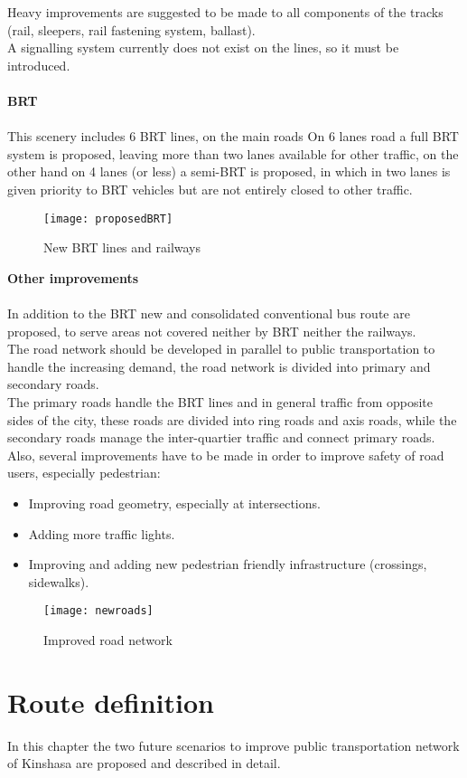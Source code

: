 \documentclass{article}
\begin{document}
Heavy improvements are suggested to be made to all components of the tracks (rail, sleepers, rail fastening system, ballast). \\ 
A signalling system currently does not exist on the lines, so it must be introduced. \\
\\
\textbf{BRT}\\
\\
This scenery includes 6 BRT lines, on the main roads 
On 6 lanes road a full BRT system is proposed, leaving more than two lanes available for other traffic, on the other hand on 4 lanes (or less) a semi-BRT is proposed, in which in two lanes is given priority to BRT vehicles but are not entirely closed to other traffic. 
\begin{figure}[H]
\centering
\texttt{[image: proposedBRT]}
\caption{New BRT lines and railways}
\end{figure}
\noindent \textbf{Other improvements}\\
\\
In addition to the BRT new and consolidated conventional bus route are proposed, to serve areas not covered neither by BRT neither the railways.\\
The road network should be developed in parallel to public transportation to handle the increasing demand, the road network is divided into primary and secondary roads.\\
The primary roads handle the BRT lines and in general traffic from opposite sides of the city, these roads are divided into ring roads and axis roads, while the secondary roads manage the inter-quartier traffic and connect primary roads.\\
Also, several improvements have to be made in order to improve safety of road users, especially pedestrian: 
\begin{itemize}
\item{Improving road geometry, especially at intersections.}
\item{Adding more traffic lights.}
\item{Improving and adding new pedestrian friendly infrastructure (crossings, sidewalks).}
 \end{itemize}
 
 \begin{figure}[H]
\centering
\texttt{[image: newroads]}
\caption{Improved road network}
\end{figure} 
 \newpage
\section{Route definition} %
In this chapter the two future scenarios to improve public transportation network of Kinshasa are proposed and described in detail.
\end{document}
